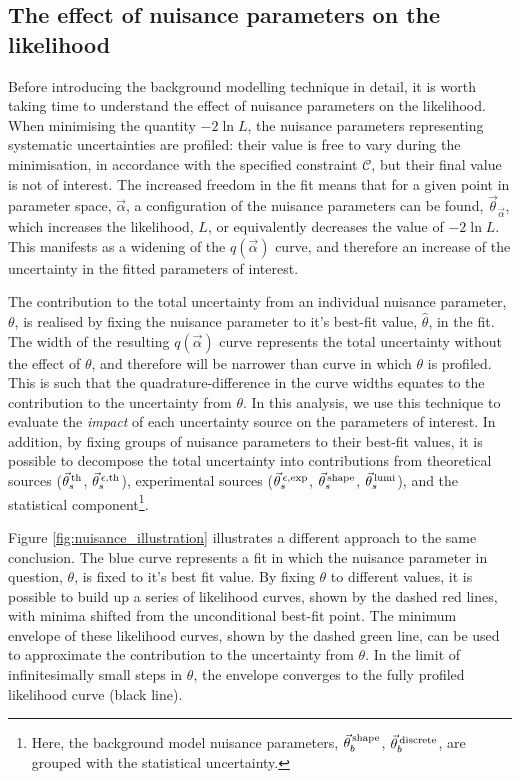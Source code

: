 \subsection{The effect of nuisance parameters on the likelihood}\label{sec:effect_of_nuisance}
Before introducing the background modelling technique in detail, it is worth taking time to understand the effect of nuisance parameters on the likelihood. When minimising the quantity $-2\ln{L}$, the nuisance parameters representing systematic uncertainties are profiled: their value is free to vary during the minimisation, in accordance with the specified constraint $\mathcal{C}$, but their final value is not of interest. The increased freedom in the fit means that for a given point in parameter space, $\vec{\alpha}$, a configuration of the nuisance parameters can be found, $\vec{\theta}_{\vec{\alpha}}$, which increases the likelihood, $L$, or equivalently decreases the value of $-2\ln{L}$. This manifests as a widening of the $q(\vec{\alpha})$ curve, and therefore an increase of the uncertainty in the fitted parameters of interest.

The contribution to the total uncertainty from an individual nuisance parameter, $\theta$, is realised by fixing the nuisance parameter to it's best-fit value, $\hat{\theta}$, in the fit. The width of the resulting $q(\vec{\alpha})$ curve represents the total uncertainty without the effect of $\theta$, and therefore will be narrower than curve in which $\theta$ is profiled. This is such that the quadrature-difference in the curve widths equates to the contribution to the uncertainty from $\theta$. In this analysis, we use this technique to evaluate the \textit{impact} of each uncertainty source on the parameters of interest. In addition, by fixing groups of nuisance parameters to their best-fit values, it is possible to decompose the total uncertainty into contributions from theoretical sources ($\vec{\theta}^{\,\rm{th}}_{s}$, $\vec{\theta}^{\,\epsilon,{\rm{th}}}_{s}$), experimental sources ($\vec{\theta}^{\,\epsilon,{\rm{exp}}}_{s}$, $\vec{\theta}^{\,\rm{shape}}_{s}$, $\vec{\theta}^{\,\rm{lumi}}_{s}$), and the statistical component\footnote{Here, the background model nuisance parameters, $\vec{\theta}^{\,\rm{shape}}_{b}$, $\vec{\theta}^{\,\rm{discrete}}_{b}$, are grouped with the statistical uncertainty.}. 

Figure \ref{fig:nuisance_illustration} illustrates a different approach to the same conclusion. The blue curve represents a fit in which the nuisance parameter in question, $\theta$, is fixed to it's best fit value. By fixing $\theta$ to different values, it is possible to build up a series of likelihood curves, shown by the dashed red lines, with minima shifted from the unconditional best-fit point. The minimum envelope of these likelihood curves, shown by the dashed green line, can be used to approximate the contribution to the uncertainty from $\theta$. In the limit of infinitesimally small steps in $\theta$, the envelope converges to the fully profiled likelihood curve (black line).

